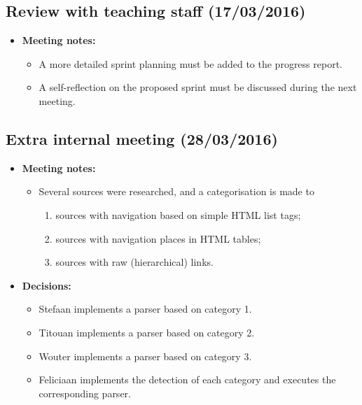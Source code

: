 \documentclass[a4paper,12pt]{article}
\begin{document}
\subsection{Review with teaching staff (17/03/2016)}
\begin{itemize}
\item \textbf{Meeting notes:} 
\begin{itemize}
\item A more detailed sprint planning must be added to the progress report.
\item A self-reflection on the proposed sprint must be discussed during the next meeting.
\end{itemize}
\end{itemize}



\subsection{Extra internal meeting (28/03/2016)}
\begin{itemize}
\item \textbf{Meeting notes:} 
\begin{itemize}
\item Several sources were researched, and a categorisation is made to
\begin{enumerate}
\item sources with navigation based on simple HTML list tags;
\item sources with navigation places in HTML tables;
\item sources with raw (hierarchical) links.
\end{enumerate}
\end{itemize}
\item \textbf{Decisions:} 
\begin{itemize}
\item Stefaan implements a parser based on category 1.
\item Titouan implements a parser based on category 2.
\item Wouter implements a parser based on category 3.
\item Feliciaan implements the detection of each category and executes the corresponding parser.
\end{itemize}
\end{itemize}
\end{document}
